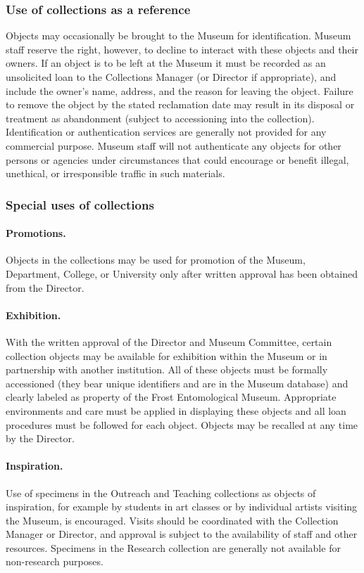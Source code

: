 \documentclass[letterpaper, 11pt]{article}
\begin{document}
\subsubsection{Use of collections as a reference}
Objects may occasionally be brought to the Museum for identification. Museum staff reserve the right, however, to decline to interact with these objects and their owners. If an object is to be left at the Museum it must be recorded as an unsolicited loan to the Collections Manager (or Director if appropriate), and include the owner's name, address, and the reason for leaving the object. Failure to remove the object by the stated reclamation date may result in its disposal or treatment as abandonment (subject to accessioning into the collection). Identification or authentication services are generally not provided for any commercial purpose. Museum staff will not authenticate any objects for other persons or agencies under circumstances that could encourage or benefit illegal, unethical, or irresponsible traffic in such materials. 

\subsubsection{Special uses of collections}
\paragraph*{Promotions.} Objects in the collections may be used for promotion of the Museum, Department, College, or University only after written approval has been obtained from the Director.

\paragraph*{Exhibition.}
With the written approval of the Director and Museum Committee, certain collection objects may be available for exhibition within the Museum or in partnership with another institution. All of these objects must be formally accessioned (they bear unique identifiers and are in the Museum database) and clearly labeled as property of the Frost Entomological Museum. Appropriate environments and care must be applied in displaying these objects and all loan procedures must be followed for each object. Objects may be recalled at any time by the Director. 

\paragraph*{Inspiration.}
Use of specimens in the Outreach and Teaching collections as objects of inspiration, for example by students in art classes or by individual artists visiting the Museum, is encouraged. Visits should be coordinated with the Collection Manager or Director, and approval is subject to the availability of staff and other resources. Specimens in the Research collection are generally not available for non-research purposes.
\end{document}
